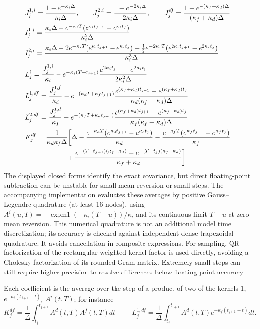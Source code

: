 \begin{align*}
& J_j^{1,i} = \frac{1-e^{-\kappa_i\Delta }}{\kappa_i\Delta}, \qquad
 J_j^{2,i} = \frac{1-e^{-2\kappa_i\Delta } }{2\kappa_i\Delta}, \qquad
 J_j^{df} = \frac{1 - e^{-(\kappa_f +\kappa_d)\Delta}}{(\kappa_f +\kappa_d)\Delta} \bigskip\\
& I^{1,i}_j = \frac{\kappa_i\Delta-e^{-\kappa_i T }(e^{\kappa_i t_{j+1} }-e^{\kappa_i t_{j} }) }{\kappa_i^2 \Delta} \\
& I^{2,i}_j = \frac{\kappa_i\Delta  -2e^{-\kappa_i T }(e^{\kappa_i t_{j+1} }-e^{\kappa_i t_{j} }) +\frac{1}{2}e^{-2\kappa_i T }(e^{2\kappa_i t_{j+1} }-e^{2\kappa_i t_{j} }) }{\kappa_i^3\Delta}\\
& L_j^i = \frac{J_j^{1,i}}{\kappa_i}-e^{-\kappa_i(T + t_{j+1}) } \frac{ e^{2\kappa_i t_{j+1} }-e^{2\kappa_i t_{j} }  }{2\kappa_i^2\Delta} \\
& L^{1,df}_j = \frac{J_j^{1,f}}{\kappa_d}-e^{- (\kappa_d T + \kappa_f t_{j+1}) } \frac{ e^{(\kappa_f +\kappa_d) t_{j+1} }-e^{(\kappa_f +\kappa_d) t_{j} }  }{\kappa_d(\kappa_f +\kappa_d)\Delta}\\
& L^{2,df}_j = \frac{J_j^{1,d}}{\kappa_f}-e^{- (\kappa_f T + \kappa_d t_{j+1}) } \frac{ e^{(\kappa_f +\kappa_d) t_{j+1} }-e^{(\kappa_f +\kappa_d) t_{j} }  }{\kappa_f(\kappa_f +\kappa_d)\Delta}\\
& K^{df}_j = \frac{1}{\kappa_d\kappa_f\Delta}\bigg[\Delta - \frac{e^{-\kappa_d T}(e^{\kappa_d t_{j+1}} - e^{\kappa_d t_j} )}{\kappa_d} - \frac{e^{-\kappa_f T}(e^{\kappa_f t_{j+1}} - e^{\kappa_f t_j} )}{\kappa_f}\\
& \qquad\qquad\qquad + \frac{e^{-(T-t_{j+1})(\kappa_f +\kappa_d)} - e^{-(T-t_{j})(\kappa_f +\kappa_d)}}{\kappa_f +\kappa_d}\bigg]
\end{align*}
The displayed closed forms identify the exact covariance, but direct
floating-point subtraction can be unstable for small mean reversion or small
steps. The accompanying implementation evaluates these averages by positive
Gauss--Legendre quadrature (at least 16 nodes), using
$A^i(u,T)=-\operatorname{expm1}(-\kappa_i(T-u))/\kappa_i$ and its continuous
limit $T-u$ at zero mean reversion. This numerical quadrature is not an additional
model time discretization; its accuracy is checked against independent dense trapezoidal
quadrature. It avoids cancellation in composite expressions. For sampling, QR factorization of the rectangular weighted kernel factor
is used directly, avoiding a Cholesky factorization of its rounded Gram matrix.
Extremely small steps can still require higher precision to resolve differences
below floating-point accuracy.

Each coefficient is the average over the step of a product of two of the kernels $1$, $e^{-\kappa_i(t_{j+1}-t)}$, $A^i(t,T)$; for instance
$$K^{df}_j=\frac{1}{\Delta}\int_{t_j}^{t_{j+1}}A^d(t,T)A^f(t,T)dt,\qquad L^{1,df}_j=\frac{1}{\Delta}\int_{t_j}^{t_{j+1}}A^d(t,T)e^{-\kappa_f(t_{j+1}-t)}dt.$$
